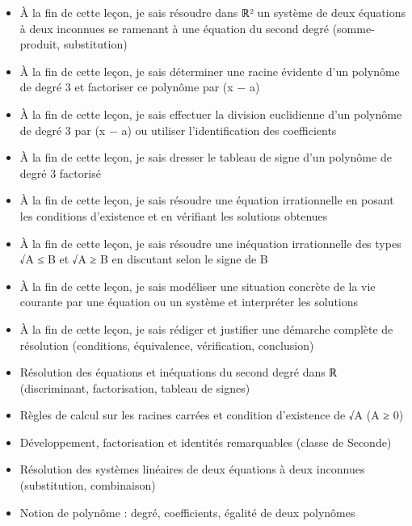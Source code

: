 \documentclass[11pt]{article}
\begin{document}
\begin{objectifs}
\begin{itemize}
\item À la fin de cette leçon, je sais résoudre dans ℝ² un système de deux équations à deux inconnues se ramenant à une équation du second degré (somme-produit, substitution)
\item À la fin de cette leçon, je sais déterminer une racine évidente d'un polynôme de degré 3 et factoriser ce polynôme par (x − a)
\item À la fin de cette leçon, je sais effectuer la division euclidienne d'un polynôme de degré 3 par (x − a) ou utiliser l'identification des coefficients
\item À la fin de cette leçon, je sais dresser le tableau de signe d'un polynôme de degré 3 factorisé
\item À la fin de cette leçon, je sais résoudre une équation irrationnelle en posant les conditions d'existence et en vérifiant les solutions obtenues
\item À la fin de cette leçon, je sais résoudre une inéquation irrationnelle des types √A ≤ B et √A ≥ B en discutant selon le signe de B
\item À la fin de cette leçon, je sais modéliser une situation concrète de la vie courante par une équation ou un système et interpréter les solutions
\item À la fin de cette leçon, je sais rédiger et justifier une démarche complète de résolution (conditions, équivalence, vérification, conclusion)
\end{itemize}
\end{objectifs}

\begin{prerequis}
\begin{itemize}
\item Résolution des équations et inéquations du second degré dans ℝ (discriminant, factorisation, tableau de signes)
\item Règles de calcul sur les racines carrées et condition d'existence de √A (A ≥ 0)
\item Développement, factorisation et identités remarquables (classe de Seconde)
\item Résolution des systèmes linéaires de deux équations à deux inconnues (substitution, combinaison)
\item Notion de polynôme : degré, coefficients, égalité de deux polynômes
\end{itemize}
\end{prerequis}
\end{document}
